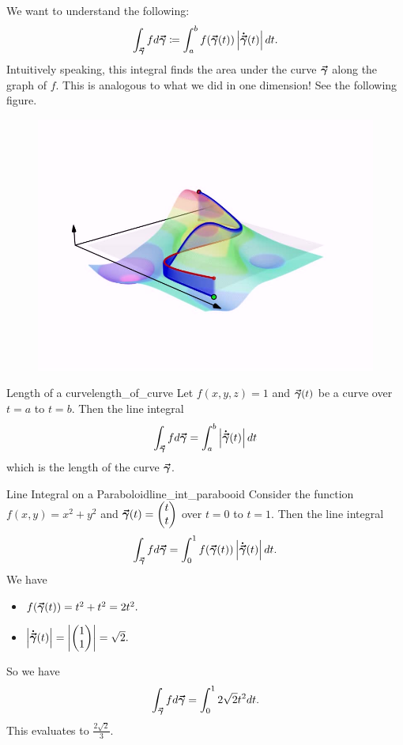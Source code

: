                        We want to understand the following:
                       \[
                       \int_{\boldsymbol{\vec{\gamma}}} fd\boldsymbol{\vec{\gamma}} \coloneqq \int_a^b f(\boldsymbol{\vec{\gamma}}(t))\left|\boldsymbol{\dot{\vec{\gamma}}}(t)\right|dt.
                       \]
                       Intuitively speaking, this integral finds the area under the curve $\boldsymbol{\vec{\gamma}}$ along the graph of $f$.  This is analogous to what we did in one dimension! See the following figure.
                       \begin{figure}[H]
                           \centering
                           \includegraphics[width=.5\textwidth]{Figures_Part_6/Line_integral_of_scalar_field.jpg}
                       \end{figure}

                       \begin{ex}{Length of a curve}{length_of_curve}
                       Let $f(x,y,z)=1$ and $\boldsymbol{\vec{\gamma}}(t)$ be a curve over $t=a$ to $t=b$.  Then the line integral
                       \[
                       \int_{\boldsymbol{\vec{\gamma}}} fd\boldsymbol{\vec{\gamma}} = \int_a^b \left|\boldsymbol{\dot{\vec{\gamma}}}(t)\right|dt
                       \]
                      which is the length of the curve $\boldsymbol{\vec{\gamma}}$.
                       \end{ex}

                       \begin{ex}{Line Integral on a Paraboloid}{line_int_parabooid}
                       Consider the function $f(x,y)=x^2+y^2$ and $\boldsymbol{\vec{\gamma}}(t)=\begin{pmatrix} t \\ t \end{pmatrix}$ over $t=0$ to $t=1$.  Then the line integral
                       \[
                       \int_{\boldsymbol{\vec{\gamma}}} fd\boldsymbol{\vec{\gamma}} = \int_0^1 f(\boldsymbol{\vec{\gamma}}(t))\left|\boldsymbol{\dot{\vec{\gamma}}}(t)\right|dt.
                       \]
                       We have
                       \begin{itemize}
                           \item $f(\boldsymbol{\vec{\gamma}}(t))=t^2+t^2=2t^2.$
                           \item $\left|\boldsymbol{\dot{\vec{\gamma}}}(t)\right|=\left|\begin{pmatrix} 1 \\ 1\end{pmatrix}\right|=\sqrt{2}.$
                       \end{itemize}
                       So we have
                       \[
                       \int_{\boldsymbol{\vec{\gamma}}} fd\boldsymbol{\vec{\gamma}} = \int_0^1 2\sqrt{2}t^2dt.
                       \]
                       This evaluates to $\frac{2\sqrt{2}}{3}$.
                       \end{ex}

